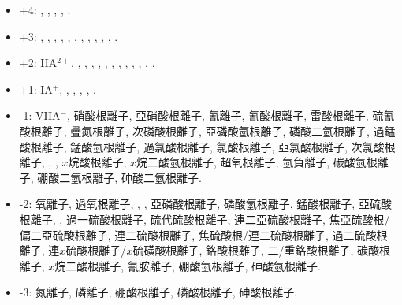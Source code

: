\documentclass[a4paper,12pt]{report}
\begin{document}
\begin{itemize}
\item +4: , , , , .
\item +3: , , , , , , , , , , , .
\item +2: IIA$^{2+}$, , , , , , , , , , , , .
\item +1: IA$^+$, , , , , .
\item -1: VIIA$^-$, 硝酸根離子, 亞硝酸根離子, 氰離子, 氰酸根離子, 雷酸根離子, 硫氰酸根離子, 疊氮根離子, 次磷酸根離子, 亞磷酸氫根離子, 磷酸二氫根離子, 過錳酸根離子, 錳酸氫根離子, 過氯酸根離子, 氯酸根離子, 亞氯酸根離子, 次氯酸根離子, , , $x$烷酸根離子, $x$烷二酸氫根離子, 超氧根離子, 氫負離子, 碳酸氫根離子, 硼酸二氫根離子, 砷酸二氫根離子.
\item -2: 氧離子, 過氧根離子, , , 亞磷酸根離子, 磷酸氫根離子, 錳酸根離子, 亞硫酸根離子, , 過一硫酸根離子, 硫代硫酸根離子, 連二亞硫酸根離子, 焦亞硫酸根/偏二亞硫酸根離子, 連二硫酸根離子, 焦硫酸根/連二硫酸根離子, 過二硫酸根離子, 連$x$硫酸根離子/$x$硫磺酸根離子, 鉻酸根離子, 二/重鉻酸根離子, 碳酸根離子, $x$烷二酸根離子, 氰胺離子, 硼酸氫根離子, 砷酸氫根離子.
\item -3: 氮離子, 磷離子, 硼酸根離子, 磷酸根離子, 砷酸根離子.
\end{itemize}
\end{document}
